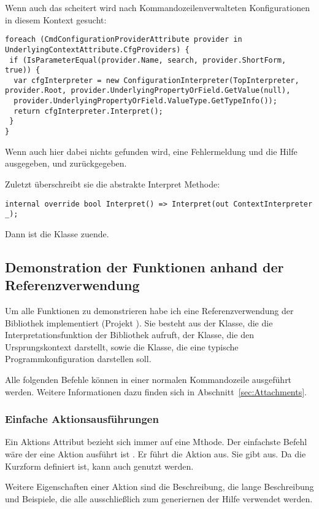 Wenn auch das scheitert wird nach Kommandozeilenverwalteten Konfigurationen in diesem Kontext gesucht:
\begin{lstlisting}[title=""]
foreach (CmdConfigurationProviderAttribute provider in UnderlyingContextAttribute.CfgProviders) {
 if (IsParameterEqual(provider.Name, search, provider.ShortForm, true)) {
  var cfgInterpreter = new ConfigurationInterpreter(TopInterpreter, provider.Root, provider.UnderlyingPropertyOrField.GetValue(null),
  provider.UnderlyingPropertyOrField.ValueType.GetTypeInfo());
  return cfgInterpreter.Interpret();
 }
}
\end{lstlisting}
Wenn auch hier dabei nichts gefunden wird, eine Fehlermeldung und die Hilfe ausgegeben, und  zurückgegeben.

Zuletzt überschreibt sie die abstrakte Interpret Methode:
\begin{lstlisting}[title=""]
 internal override bool Interpret() => Interpret(out ContextInterpreter _);
\end{lstlisting}
Dann ist die Klasse zuende.
\subsection{Demonstration der Funktionen anhand der Referenzverwendung}\label{subsec:demonstration}
Um alle Funktionen zu demonstrieren habe ich eine Referenzverwendung der Bibliothek implementiert (Projekt ).
Sie besteht aus der  Klasse, die die Interpretationsfunktion der Bibliothek aufruft, der  Klasse, 
die den Ursprungskontext darstellt, sowie die  Klasse, die eine typische Programmkonfiguration darstellen soll.

Alle folgenden Befehle können in einer normalen Kommandozeile ausgeführt werden.
Weitere Informationen dazu finden sich in Abschnitt~\ref{sec:Attachments}.
\subsubsection{Einfache Aktionsausführungen}
Ein Aktions Attribut bezieht sich immer auf eine Mthode.
Der einfachste Befehl wäre der eine Aktion ausführt ist .
Er führt die  Aktion aus.
Sie gibt  aus.
Da die Kurzform  definiert ist, kann auch  genutzt werden.

Weitere Eigenschaften einer Aktion sind die Beschreibung, die lange Beschreibung und Beispiele, die alle ausschlie\ss lich zum generiernen der Hilfe verwendet werden.

